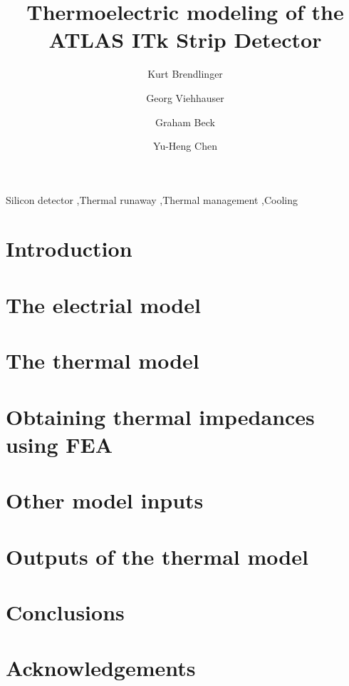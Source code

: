 \documentclass[preprint]{elsarticle/elsarticle}
\begin{document}
\begin{frontmatter}

\title{Thermoelectric modeling of the ATLAS ITk Strip Detector}
\author[1]{Kurt Brendlinger} %
\author[2]{Georg Viehhauser} %
\author[3]{Graham Beck}      %
\author[4]{Yu-Heng Chen}     %
\address{}

\begin{abstract}

\end{abstract}

\begin{keyword}
Silicon detector \sep Thermal runaway \sep Thermal management \sep Cooling
\end{keyword}

\end{frontmatter}

\section{Introduction}


\section{The electrial model}


\section{The thermal model}


\section{Obtaining thermal impedances using FEA}


\section{Other model inputs}


\section{Outputs of the thermal model}


\section{Conclusions}


\section{Acknowledgements}




\end{document}

